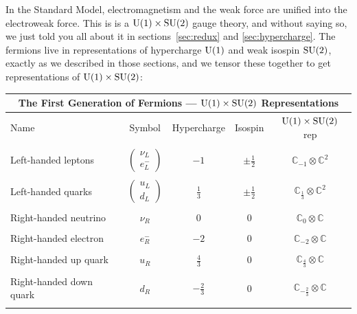 \documentclass{article}
\newcommand{\C}{{\mathbb C}}  %
\newcommand{\U}{{\rm U}}    %
\newcommand{\SU}{{\rm SU}}    %
\newcommand{\half}{\frac{1}{2}} %
\newcommand{\third}{\frac{1}{3}} %
\newcommand{\twothirds}{\frac{2}{3}} %
\newcommand{\fourthirds}{\frac{4}{3}} %
\newcommand{\lep}{\left( \! \begin{array}{c} \nu_L \\ e^-_L \end{array} \! \right)} %
\newcommand{\quark}{\left( \! \begin{array}{c} u_L \\ d_L \end{array} \! \right)} %
\begin{document}
In the Standard Model, electromagnetism and the weak force are unified into the
electroweak force. This is is a $\U(1) \times \SU(2)$ gauge theory, and without
saying so, we just told you all about it in sections~\ref{sec:redux} and
\ref{sec:hypercharge}. The fermions live in representations of hypercharge
$\U(1)$ and weak isospin $\SU(2)$, exactly as we described in those sections,
and we tensor these together to get representations of $\U(1) \times \SU(2)$:
\begin{center}
	\begin{tabular}{lcccc}
         \hline
         \multicolumn{5}{|c|}{\textbf{The First Generation of Fermions ---
\boldmath $\U(1) \times \SU(2)$ Representations}} \\
         \hline
         Name                    & Symbol   & Hypercharge   & Isospin    & $\U(1) \times \SU(2)$ rep \\
         \hline                              
	 \\
         Left-handed leptons     & $\lep$   & $-1$          & $\pm\half$ & $\C_{-1} \otimes \C^2$ \\
         \\                                                                                  
         Left-handed quarks      & $\quark$ & $\third$      & $\pm\half$ & $\C_{\third} \otimes \C^2$ \\
         \\                                                                                  
         Right-handed neutrino   & $\nu_R$  & $0$           & $0$        & $\C_{0} \otimes \C$ \\
	 \\                                                                                  
         Right-handed electron   & $e^-_R$  & $-2$          & $0$        & $\C_{-2} \otimes \C$ \\
	 \\                                                                                  
         Right-handed up quark   & $u_R$    & $\fourthirds$ & $0$        & $\C_{\fourthirds} \otimes \C$ \\
	 \\                                                                                  
         Right-handed down quark & $d_R$    & $-\twothirds$ & $0$        & $\C_{-\twothirds} \otimes \C$ \\
	 \\
         \hline                              
\end{tabular}                                
\end{center}
\end{document}
